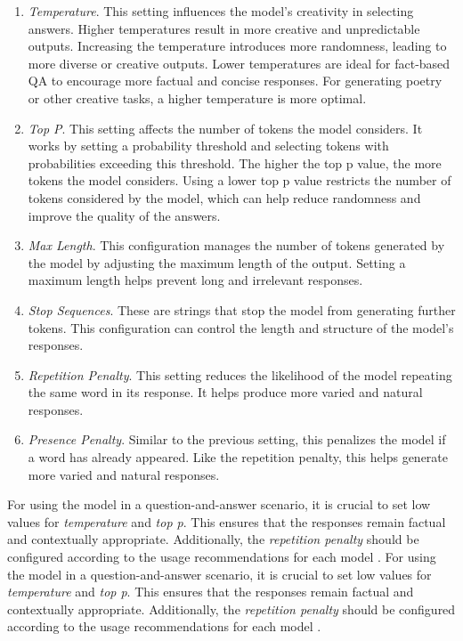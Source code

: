 \begin{enumerate}[nolistsep]

  \item \emph{Temperature}. This setting influences the model's creativity in selecting answers. Higher temperatures result in more creative and unpredictable outputs. Increasing the temperature introduces more randomness, leading to more diverse or creative outputs. Lower temperatures are ideal for fact-based QA to encourage more factual and concise responses. For generating poetry or other creative tasks, a higher temperature is more optimal.
  
  \item \emph{Top P}. This setting affects the number of tokens the model considers. It works by setting a probability threshold and selecting tokens with probabilities exceeding this threshold. The higher the top p value, the more tokens the model considers. Using a lower top p value restricts the number of tokens considered by the model, which can help reduce randomness and improve the quality of the answers.
  
  \item \emph{Max Length}. This configuration manages the number of tokens generated by the model by adjusting the maximum length of the output. Setting a maximum length helps prevent long and irrelevant responses.
  
  \item \emph{Stop Sequences}. These are strings that stop the model from generating further tokens. This configuration can control the length and structure of the model's responses.
  
  \item \emph{Repetition Penalty}. This setting reduces the likelihood of the model repeating the same word in its response. It helps produce more varied and natural responses.
  
  \item \emph{Presence Penalty}. Similar to the previous setting, this penalizes the model if a word has already appeared. Like the repetition penalty, this helps generate more varied and natural responses.
  
\end{enumerate} 
For using the model in a question-and-answer scenario, it is crucial to set low values for \emph{temperature} and \emph{top p}. This ensures that the responses remain factual and contextually appropriate. Additionally, the \emph{repetition penalty} should be configured according to the usage recommendations for each model \cite{llamacppdocs,hfdocs}. For using the model in a question-and-answer scenario, it is crucial to set low values for \emph{temperature} and \emph{top p}. This ensures that the responses remain factual and contextually appropriate. Additionally, the \emph{repetition penalty} should be configured according to the usage recommendations for each model \cite{llamacppdocs,hfdocs}.
